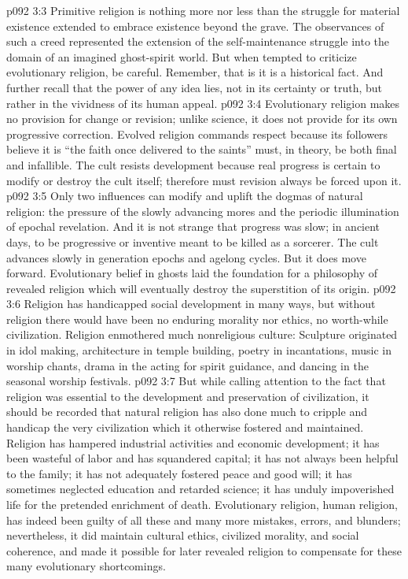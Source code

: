 \vs p092 3:3 \pc Primitive religion is nothing more nor less than the struggle for material existence extended to embrace existence beyond the grave. The observances of such a creed represented the extension of the self\hyp{}maintenance struggle into the domain of an imagined ghost\hyp{}spirit world. But when tempted to criticize evolutionary religion, be careful. Remember, that is  it is a historical fact. And further recall that the power of any idea lies, not in its certainty or truth, but rather in the vividness of its human appeal.
\vs p092 3:4 \pc Evolutionary religion makes no provision for change or revision; unlike science, it does not provide for its own progressive correction. Evolved religion commands respect because its followers believe it is  “the faith once delivered to the saints” must, in theory, be both final and infallible. The cult resists development because real progress is certain to modify or destroy the cult itself; therefore must revision always be forced upon it.
\vs p092 3:5 Only two influences can modify and uplift the dogmas of natural religion: the pressure of the slowly advancing mores and the periodic illumination of epochal revelation. And it is not strange that progress was slow; in ancient days, to be progressive or inventive meant to be killed as a sorcerer. The cult advances slowly in generation epochs and agelong cycles. But it does move forward. Evolutionary belief in ghosts laid the foundation for a philosophy of revealed religion which will eventually destroy the superstition of its origin.
\vs p092 3:6 Religion has handicapped social development in many ways, but without religion there would have been no enduring morality nor ethics, no worth\hyp{}while civilization. Religion enmothered much nonreligious culture: Sculpture originated in idol making, architecture in temple building, poetry in incantations, music in worship chants, drama in the acting for spirit guidance, and dancing in the seasonal worship festivals.
\vs p092 3:7 But while calling attention to the fact that religion was essential to the development and preservation of civilization, it should be recorded that natural religion has also done much to cripple and handicap the very civilization which it otherwise fostered and maintained. Religion has hampered industrial activities and economic development; it has been wasteful of labor and has squandered capital; it has not always been helpful to the family; it has not adequately fostered peace and good will; it has sometimes neglected education and retarded science; it has unduly impoverished life for the pretended enrichment of death. Evolutionary religion, human religion, has indeed been guilty of all these and many more mistakes, errors, and blunders; nevertheless, it did maintain cultural ethics, civilized morality, and social coherence, and made it possible for later revealed religion to compensate for these many evolutionary shortcomings.
